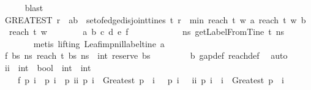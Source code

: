 \begin{isabellebody}
\ \ \ \ \isamarkupfalse%
\ blast\isanewline
\ \ \isamarkupfalse%
\ \isamarkupfalse%
\ {\isachardoublequoteopen}{\isacharparenleft}GREATEST\ r{\isachardot}\ {\isacharparenleft}{\isasymexists}\ {\isacharparenleft}a{\isacharcomma}b{\isacharparenright}\ {\isasymin}\ set{\isacharunderscore}of{\isacharunderscore}edge{\isacharunderscore}disjoint{\isacharunderscore}tines\ t{\isachardot}\ r\ {\isacharequal}\ min\ {\isacharparenleft}reach\ t\ w\ a{\isacharparenright}\ {\isacharparenleft}reach\ t\ w\ b{\isacharparenright}{\isacharparenright}{\isacharparenright}\ {\isasymge}\ reach\ t\ w\ {\isacharbrackleft}{\isacharbrackright}{\isachardoublequoteclose}\ \isanewline
\ \ \ \ \isamarkupfalse%
\ a\ b\ c\ d\ e\ f\ \ \isanewline
\ \ \isamarkupfalse%
\ {\isacharminus}\isanewline
\ \ \ \ \isamarkupfalse%
\ {\isachardoublequoteopen}{\isasymAnd}ns{\isachardot}\ getLabelFromTine\ t\ ns\ {\isacharequal}\ {\isacharbrackleft}{\isacharbrackright}{\isachardoublequoteclose}\isanewline
\ \ \ \ \ \ \isamarkupfalse%
\ {\isacharparenleft}metis\ {\isacharparenleft}lifting{\isacharparenright}\ Leaf{\isacharunderscore}imp{\isacharunderscore}nil{\isacharunderscore}label{\isacharunderscore}tine\ a{\isacharparenright}\isanewline
\ \ \ \ \isamarkupfalse%
\ \isamarkupfalse%
\ f{}{\isacharcolon}\ {\isachardoublequoteopen}{\isasymAnd}bs\ ns{\isachardot}\ reach\ t\ bs\ ns\ {\isacharequal}\ int\ {\isacharparenleft}reserve\ bs\ {\isacharbrackleft}{\isacharbrackright}{\isacharparenright}{\isachardoublequoteclose}\isanewline
\ \ \ \ \ \ \isamarkupfalse%
\ b\ gap{\isacharunderscore}def\ reach{\isacharunderscore}def\ \isamarkupfalse%
\ auto\isanewline
\ \ \isamarkupfalse%
\ ii\ {\isacharcolon}{\isacharcolon}\ {\isachardoublequoteopen}{\isacharparenleft}int\ {\isasymRightarrow}\ bool{\isacharparenright}\ {\isasymRightarrow}\ int\ {\isasymRightarrow}\ int{\isachardoublequoteclose}\ \isanewline
\ \ \ \ f{}{\isacharcolon}\ {\isachardoublequoteopen}{\isasymAnd}p\ i{\isachardot}\ {\isacharparenleft}{\isasymnot}\ p\ i\ {\isasymor}\ p\ {\isacharparenleft}ii\ p\ i{\isacharparenright}\ {\isasymor}\ Greatest\ p\ {\isacharequal}\ i{\isacharparenright}\ {\isasymand}\ {\isacharparenleft}{\isasymnot}\ p\ i\ {\isasymor}\ {\isasymnot}\ ii\ p\ i\ {\isasymle}\ i\ {\isasymor}\ Greatest\ p\ {\isacharequal}\ i{\isacharparenright}{\isachardoublequoteclose}\isanewline
\ \ \ \ \isamarkupfalse%

\end{isabellebody}
